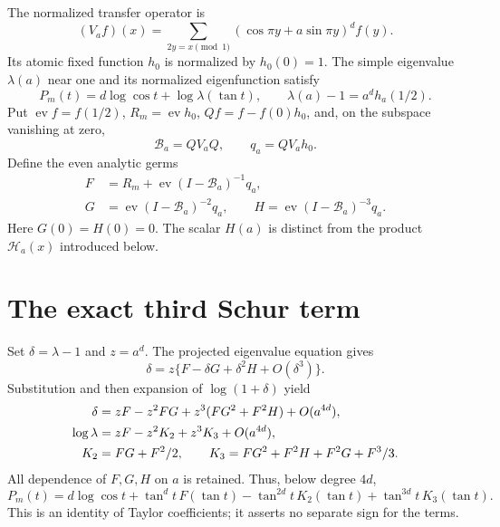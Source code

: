 \documentclass[11pt,a4paper]{article}
\theoremstyle{remark}\newtheorem*{ednote}{Editorial note (ProveIt, 2026-10-01)}
\newcommand{\ev}{\operatorname{ev}}\newcommand{\Z}{\mathbb Z}
\newcommand{\HH}{\mathcal H}\newcommand{\GG}{\mathcal G}
\begin{document}
The normalized transfer operator is
\[
 (V_af)(x)=\sum_{2y=x\pmod1}(\cos\pi y+a\sin\pi y)^d f(y).
\]
Its atomic fixed function $h_0$ is normalized by $h_0(0)=1$. The simple eigenvalue $\lambda(a)$ near one and its normalized eigenfunction satisfy
\[
 P_m(t)=d\log\cos t+\log\lambda(\tan t),\qquad
 \lambda(a)-1=a^d h_a(1/2).
\]
Put $\ev f=f(1/2)$, $R_m=\ev h_0$, $Qf=f-f(0)h_0$, and, on the subspace vanishing at zero,
\[
 \mathcal B_a=QV_aQ,\qquad q_a=QV_ah_0.
\]
Define the even analytic germs
\begin{align*}
 F&=R_m+\ev(I-\mathcal B_a)^{-1}q_a,\\
 G&=\ev(I-\mathcal B_a)^{-2}q_a,\qquad
 H=\ev(I-\mathcal B_a)^{-3}q_a.
\end{align*}
Here $G(0)=H(0)=0$. The scalar $H(a)$ is distinct from the product $\HH_a(x)$ introduced below.

\section{The exact third Schur term}
Set $\delta=\lambda-1$ and $z=a^d$. The projected eigenvalue equation gives
\[
 \delta=z\{F-\delta G+\delta^2H+O(\delta^3)\}.
\]
Substitution and then expansion of $\log(1+\delta)$ yield
\begin{align}
 \delta&=zF-z^2FG+z^3(FG^2+F^2H)+O(a^{4d}),\notag\\
 \log\lambda&=zF-z^2K_2+z^3K_3+O(a^{4d}),\label{eq:cluster}\\
 K_2&=FG+F^2/2,\qquad
 K_3=FG^2+F^2H+F^2G+F^3/3.\notag
\end{align}
All dependence of $F,G,H$ on $a$ is retained. Thus, below degree $4d$,
\begin{equation}\label{eq:pressure}
 P_m(t)=d\log\cos t+\tan^dt\,F(\tan t)
 -\tan^{2d}t\,K_2(\tan t)+\tan^{3d}t\,K_3(\tan t).
\end{equation}
This is an identity of Taylor coefficients; it asserts no separate sign for the terms.
\end{document}
